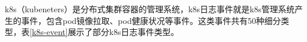 k8s（kubeneters）是分布式集群容器的管理系统，k8s日志事件就是k8s管理系统产生的事件，包含pod镜像拉取、pod健康状况等事件。这类事件共有50种细分类型，表\ref{k8s-event}展示了部分k8s日志事件类型。
\newpage
